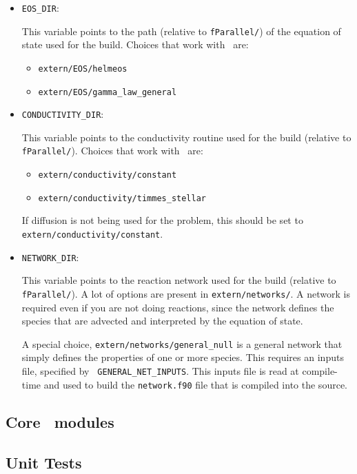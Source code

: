\begin{itemize}
\item {\tt EOS\_DIR}:

  This variable points to the path (relative to {\tt fParallel/}) of
  the equation of state used for the build.  Choices that work
  with \maestro\ are:
  \begin{itemize}
  \item {\tt extern/EOS/helmeos}
  \item {\tt extern/EOS/gamma\_law\_general}
  \end{itemize}

\item {\tt CONDUCTIVITY\_DIR}:

  This variable points to the conductivity routine used for the build
  (relative to {\tt fParallel/}).  Choices that work with \maestro\
  are:
  \begin{itemize}
  \item {\tt extern/conductivity/constant}
  \item {\tt extern/conductivity/timmes\_stellar}
  \end{itemize}
  If diffusion is not being used for the problem, this should be set
  to {\tt extern/conductivity/constant}.

\item {\tt NETWORK\_DIR}:

  This variable points to the reaction network used for the build
  (relative to {\tt fParallel/}).  A lot of options are present in
  {\tt extern/networks/}.  A network is required even if you are not
  doing reactions, since the network defines the species that are
  advected and interpreted by the equation of state.  

  A special choice, {\tt extern/networks/general\_null} is a general
  network that simply defines the properties of one or more species.
  This requires an inputs file, specified by {\tt
  GENERAL\_NET\_INPUTS}.  This inputs file is read at compile-time and
  used to build the {\tt network.f90} file that is compiled into the
  source.

\end{itemize}


\subsection{Core \maestro\ modules}

\subsection{Unit Tests}


